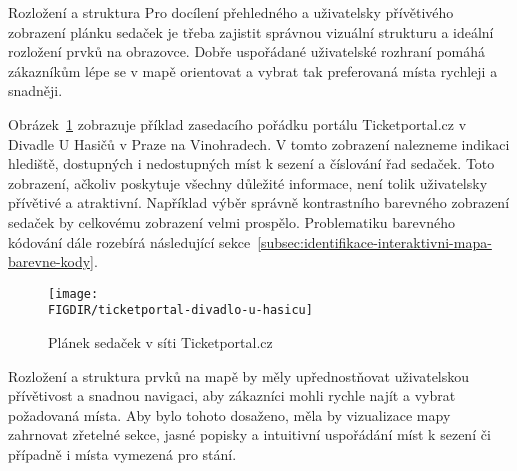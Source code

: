 \begin{subsection}{Rozložení a struktura}
    \label{subsec:identifikace-interaktivni-mapa-rozlozeni-a-struktura}
    Pro docílení přehledného a uživatelsky přívětivého zobrazení plánku sedaček je třeba zajistit správnou vizuální strukturu a ideální rozložení prvků na obrazovce.
    Dobře uspořádané uživatelské rozhraní pomáhá zákazníkům lépe se v mapě orientovat a vybrat tak preferovaná místa rychleji a snadněji.

    Obrázek~\ref{fig:venue-map-visualization-layout-and-structure} zobrazuje příklad zasedacího pořádku portálu Ticketportal.cz v Divadle U Hasičů v Praze na Vinohradech.
    V tomto zobrazení nalezneme indikaci hlediště, dostupných i nedostupných míst k sezení a číslování řad sedaček.
    Toto zobrazení, ačkoliv poskytuje všechny důležité informace, není tolik uživatelsky přívětivé a atraktivní.
    Například výběr správně kontrastního barevného zobrazení sedaček by celkovému zobrazení velmi prospělo.
    Problematiku barevného kódování dále rozebírá následující sekce~\ref{subsec:identifikace-interaktivni-mapa-barevne-kody}.

    \begin{figure}[H]
        \centering
        \caption{Plánek sedaček v síti Ticketportal.cz}
        \texttt{[image: \\FIGDIR/ticketportal-divadlo-u-hasicu]}
        \label{fig:venue-map-visualization-layout-and-structure}
    \end{figure}

    Rozložení a struktura prvků na mapě by měly upřednostňovat uživatelskou přívětivost a snadnou navigaci, aby zákazníci mohli rychle najít a vybrat požadovaná místa.
    Aby bylo tohoto dosaženo, měla by vizualizace mapy zahrnovat zřetelné sekce, jasné popisky a intuitivní uspořádání míst k sezení či případně i místa vymezená pro stání.


\end{subsection}
